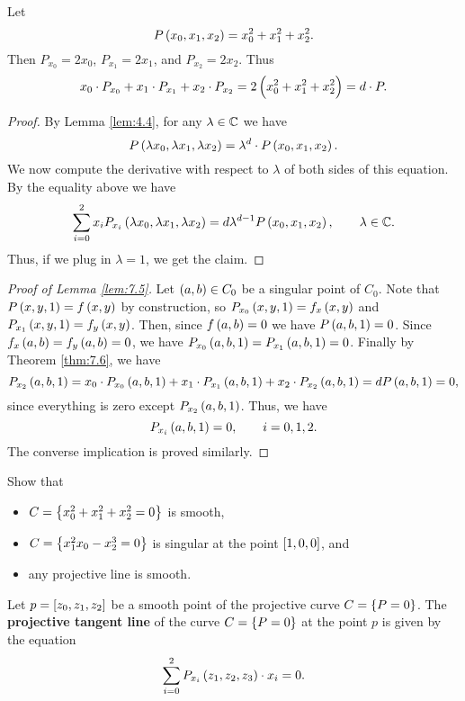 \begin{example*}
Let
$$ P\br{x_0, x_1, x_2} = x_0^2 + x_1^2 + x_2^2. $$
Then $ P_{x_0} = 2x_0 $, $ P_{x_1} = 2x_1 $, and $ P_{x_2} = 2x_2 $. Thus
$$ x_0 \cdot P_{x_0} + x_1 \cdot P_{x_1} + x_2 \cdot P_{x_2} = 2\br{x_0^2 + x_1^2 + x_2^2} = d \cdot P. $$
\end{example*}

\begin{proof}
By Lemma \ref{lem:4.4}, for any $ \lambda \in \mathbb{C} $ we have
$$ P\br{\lambda x_0, \lambda x_1, \lambda x_2} = \lambda^d \cdot P\br{x_0, x_1, x_2}. $$
We now compute the derivative with respect to $ \lambda $ of both sides of this equation. By the equality above we have
$$ \sum_{i = 0}^2 x_iP_{x_i}\br{\lambda x_0, \lambda x_1, \lambda x_2} = d\lambda^{d - 1}P\br{x_0, x_1, x_2}, \qquad \lambda \in \C. $$
Thus, if we plug in $ \lambda = 1 $, we get the claim.
\end{proof}

\begin{proof}[Proof of Lemma \ref{lem:7.5}]
Let $ \br{a, b} \in C_0 $ be a singular point of $ C_0 $. Note that $ P\br{x, y, 1} = f\br{x, y} $ by construction, so $ P_{x_0}\br{x, y, 1} = f_x\br{x, y} $ and $ P_{x_1}\br{x, y, 1} = f_y\br{x, y} $. Then, since $ f\br{a, b} = 0 $ we have $ P\br{a, b, 1} = 0 $. Since $ f_x\br{a, b} = f_y\br{a, b} = 0 $, we have $ P_{x_0}\br{a, b, 1} = P_{x_1}\br{a, b, 1} = 0 $. Finally by Theorem \ref{thm:7.6}, we have
$$ P_{x_2}\br{a, b, 1} = x_0 \cdot P_{x_0}\br{a, b, 1} + x_1 \cdot P_{x_1}\br{a, b, 1} + x_2 \cdot P_{x_2}\br{a, b, 1} = dP\br{a, b, 1} = 0, $$
since everything is zero except $ P_{x_2}\br{a, b, 1} $. Thus, we have
$$ P_{x_i}\br{a, b, 1} = 0, \qquad i = 0, 1, 2. $$
The converse implication is proved similarly.
\end{proof}

\begin{exercise}
Show that
\begin{itemize}
\item $ C = \cbr{x_0^2 + x_1^2 + x_2^2 = 0} $ is smooth,
\item $ C = \cbr{x_1^2x_0 - x_2^3 = 0} $ is singular at the point $ \sbr{1, 0, 0} $, and
\item any projective line is smooth.
\end{itemize}
\end{exercise}

\begin{definition}
Let $ p = \sbr{z_0, z_1, z_2} $ be a smooth point of the projective curve $ C = \cbr{P = 0} $. The \textbf{projective tangent line} of the curve $ C = \cbr{P = 0} $ at the point $ p $ is given by the equation
\begin{equation}
\label{eq:5}
\sum_{i = 0}^2 P_{x_i}\br{z_1, z_2, z_3} \cdot x_i = 0.
\end{equation}
\end{definition}

